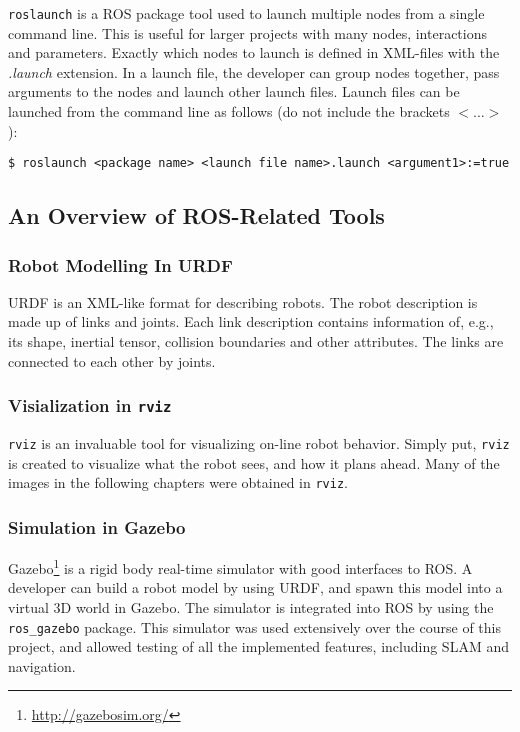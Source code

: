 \texttt{roslaunch}\cite{ROS_launch} is a \ac{ROS} package tool used to launch multiple nodes from a single command line. This is useful for larger projects with many nodes, interactions and parameters. Exactly which nodes to launch is defined in XML-files with the \textit{.launch} extension. In a launch file, the developer can group nodes together, pass arguments to the nodes and launch other launch files. Launch files can be launched from the command line as follows (do not include the brackets $<...>$):

\begin{verbatim}
$ roslaunch <package name> <launch file name>.launch <argument1>:=true
\end{verbatim}

\subsection{An Overview of ROS-Related Tools}

\subsubsection{Robot Modelling In URDF}

\ac{URDF} is an XML-like format for describing robots. The robot description is made up of links and joints. Each link description contains information of, e.g., its shape, inertial tensor, collision boundaries and other attributes. The links are connected to each other by joints.

\subsubsection{Visialization in \texttt{rviz}}

\texttt{rviz} is an invaluable tool for visualizing on-line robot behavior. Simply put, \texttt{rviz} is created to visualize what the robot sees, and how it plans ahead. Many of the images in the following chapters were obtained in \texttt{rviz}. 

\subsubsection{Simulation in Gazebo}

Gazebo\footnote{\url{http://gazebosim.org/}} is a rigid body real-time simulator with good interfaces to \ac{ROS}. A developer can build a robot model by using \ac{URDF}, and spawn this model into a virtual 3D world in Gazebo. The simulator is integrated into \ac{ROS} by using the \texttt{ros\_gazebo} package. This simulator was used extensively over the course of this project, and allowed testing of all the implemented features, including \ac{SLAM} and navigation.

